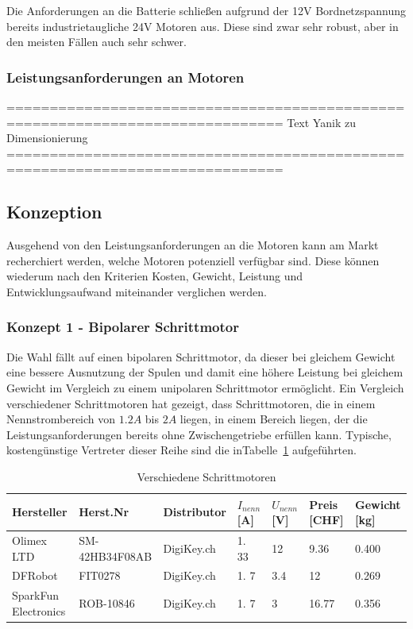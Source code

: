 \documentclass[main.  tex]{subfiles} %
\begin{document}
Die Anforderungen an die Batterie schließen aufgrund der 12V Bordnetzspannung
bereits industrietaugliche 24V Motoren aus. Diese sind zwar sehr robust, aber
in den meisten Fällen auch sehr schwer.

\subsubsection*{Leistungsanforderungen an Motoren}

==============================================================================
Text Yanik zu Dimensionierung
==============================================================================

\subsection*{Konzeption}

Ausgehend von den Leistungsanforderungen an die Motoren kann am Markt
recherchiert werden, welche Motoren potenziell verfügbar sind. Diese können
wiederum nach den Kriterien Kosten, Gewicht, Leistung und Entwicklungsaufwand
miteinander verglichen werden.

\subsubsection*{Konzept 1 - Bipolarer Schrittmotor} %

Die Wahl fällt auf einen bipolaren Schrittmotor, da dieser bei gleichem Gewicht
eine bessere Ausnutzung der Spulen und damit eine höhere Leistung bei gleichem
Gewicht im Vergleich zu einem unipolaren Schrittmotor ermöglicht. Ein Vergleich
verschiedener Schrittmotoren hat gezeigt, dass Schrittmotoren, die in einem
Nennstrombereich von $1. 2A$ bis $2A$ liegen, in einem Bereich liegen, der die
Leistungsanforderungen bereits ohne Zwischengetriebe erfüllen kann. Typische,
kostengünstige Vertreter dieser Reihe sind die
inTabelle~\ref{tab:Schrittmotoren_different} aufgeführten.

\begin{table}[h]
    \centering
    \begin{tabular}{|p{2cm}|p{3cm}|p{2cm}|p{1cm}|p{1cm}|p{1cm}|p{1.5cm}|}
        \hline
        Hersteller           & Herst.Nr     & Distributor  & $I_{nenn} $ [A] & $U_{nenn}$ [V] & Preis [CHF] & Gewicht [kg] \\ \hline
        Olimex LTD           & SM-42HB34F08AB & DigiKey.ch & 1.  33          & 12             & 9.36      & 0.400      \\ \hline
        DFRobot              & FIT0278        & DigiKey.ch & 1.  7           & 3.4          & 12          & 0.269      \\ \hline
        SparkFun Electronics & ROB-10846      & DigiKey.ch & 1.  7           & 3              & 16.77     & 0.356      \\ \hline
    \end{tabular}
    \caption{Verschiedene Schrittmotoren}
    \label{tab:Schrittmotoren_different}
\end{table}
\end{document}
